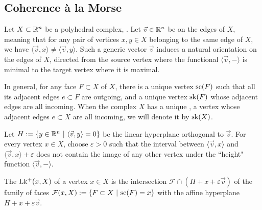 
\subsection{Coherence \`a la Morse}

Let $X\subset \mathbb R^n$ be a polyhedral complex, . 
Let $\vec v \in \mathbb R^n$ be  on the edges of $X$, meaning that for any pair of vertices $x,y \in X$ belonging to the same edge of $X$, we have $\langle \vec v , x \rangle \neq \langle \vec v, y\rangle$.  
Such a generic vector $\vec v$ induces a natural orientation on the edges of $X$, directed from the source vertex where the functional $\langle \vec v, - \rangle$ is minimal to the target vertex where it is maximal. 

In general, for any face $F \subset X$ of $X$, there is a unique  vertex $\mathrm{sc}(F)$ such that all its adjacent edges $e \subset F$ are outgoing, and a unique  vertex $\mathrm{sk}(F)$ whose adjacent edges are all incoming.
When the complex $X$ has a unique , a vertex whose adjacent edges $e \subset X$ are all incoming, we will denote it by $\mathrm{sk}(X)$. 

Let $H:=\{y \in \mathbb R^n \ | \ \langle \vec v , y \rangle = 0\}$ be the linear hyperplane orthogonal to $\vec v$.  
For every vertex $x \in X$, choose $\varepsilon >0$ such that the interval between $\langle \vec v , x \rangle$ and $\langle \vec v , x \rangle + \varepsilon$ does not contain the image of any other vertex under the ``height" function $\langle \vec v, - \rangle$. 

\begin{definition}
    The  $\operatorname{Lk^{+}}(x,X)$ of a vertex $x \in X$ is the intersection $\mathcal{F} \cap (H+x+\varepsilon \vec v)$ of the family of faces $\mathcal{F}(x,X):=\{ F \subset X \ | \ \mathrm{sc}(F)=x \}$ with the affine hyperplane $H+x+\varepsilon \vec v$. 
\end{definition}


